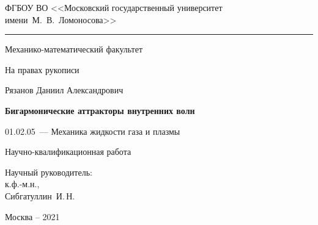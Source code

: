 \thispagestyle{empty}

{
\singlespacing
\begin{center}
ФГБОУ ВО <<Московский государственный университет имени~М.~В.~Ломоносова>>
\medskip
\hrule
\medskip
Механико-математический факультет
\end{center}

\vspace{20mm}
\begin{flushright}
На правах рукописи

\end{flushright}

\vspace{25mm}
\begin{center}
{\large Рязанов Даниил Александрович}
\end{center}

\vspace{5mm}
\begin{center}
{\bf \large Бигармонические аттракторы внутренних волн 
\par}

\vspace{10mm}
{
01.02.05~--- Механика жидкости газа и плазмы
}





\vspace{10mm}
Научно-квалификационная работа
\end{center}

\vspace{16mm}
\begin{flushright}
Научный руководитель:\\[2mm]
к.ф.-м.н., \\
Сибгатуллин~И.\,Н.\\

\end{flushright}

\vfill
\begin{center}
{Москва -- 2021}
\end{center}
}
\newpage
\restoregeometry